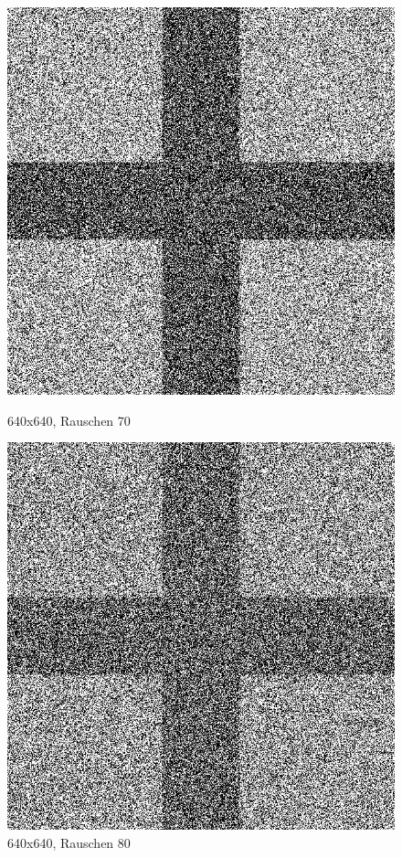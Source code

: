 \begin{figure}[hbt]
	\begin{minipage}{0.5 \textwidth}
		\includegraphics[width=\textwidth]{./Bilder/Auswertung/BeispielBilder/Picture_Crossing_noise_70_pixelCnt_128_featureCnt_5}
		\caption{640x640, Rauschen 70}
	\end{minipage}
	\hfill
	\begin{minipage}{0.5 \textwidth}
		\includegraphics[width=\textwidth]{./Bilder/Auswertung/BeispielBilder/Picture_Crossing_noise_80_pixelCnt_128_featureCnt_5}
		\caption{640x640, Rauschen 80}
	\end{minipage}
\end{figure}

